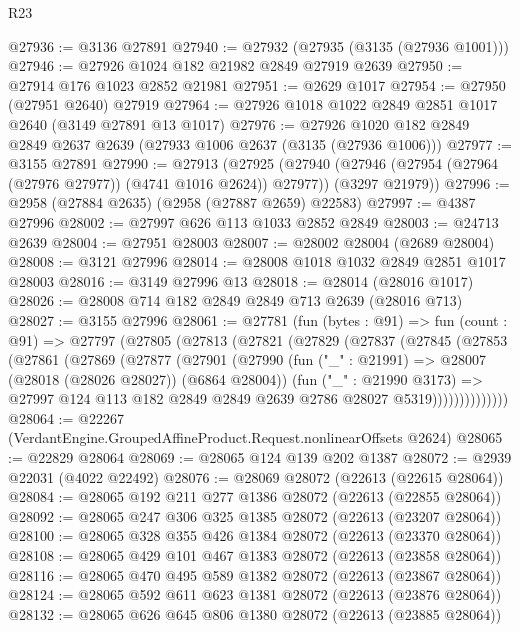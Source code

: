 \begin{lexlean}{R23}
\begin{coremodule}
@27936 := @3136 @27891
@27940 := @27932 (@27935 (@3135 (@27936 @1001)))
@27946 := @27926 @1024 @182 @21982 @2849 @27919 @2639
@27950 := @27914 @176 @1023 @2852 @21981
@27951 := @2629 @1017
@27954 := @27950 (@27951 @2640) @27919
@27964 := @27926 @1018 @1022 @2849 @2851 @1017 @2640 (@3149 @27891 @13 @1017)
@27976 := @27926 @1020 @182 @2849 @2849 @2637 @2639 (@27933 @1006 @2637 (@3135 (@27936 @1006)))
@27977 := @3155 @27891
@27990 := @27913
    (@27925
      (@27940 (@27946 (@27954 (@27964 (@27976 @27977)) (@4741 @1016 @2624)) @27977))
      (@3297 @21979))
@27996 := @2958 (@27884 @2635) (@2958 (@27887 @2659) @22583)
@27997 := @4387 @27996
@28002 := @27997 @626 @113 @1033 @2852 @2849
@28003 := @24713 @2639
@28004 := @27951 @28003
@28007 := @28002 @28004 (@2689 @28004)
@28008 := @3121 @27996
@28014 := @28008 @1018 @1032 @2849 @2851 @1017 @28003
@28016 := @3149 @27996 @13
@28018 := @28014 (@28016 @1017)
@28026 := @28008 @714 @182 @2849 @2849 @713 @2639 (@28016 @713)
@28027 := @3155 @27996
@28061 := @27781
    (fun (bytes : @91) =>
    fun (count : @91) =>
    @27797
      (@27805
        (@27813
          (@27821
            (@27829
              (@27837
                (@27845
                  (@27853
                    (@27861
                      (@27869
                        (@27877
                          (@27901
                            (@27990
                              (fun ("_" : @21991) => @28007 (@28018 (@28026 @28027)) (@6864 @28004))
                              (fun ("_" : @21990 @3173) =>
                              @27997
                                @124
                                @113
                                @182
                                @2849
                                @2849
                                @2639
                                @2786
                                @28027
                                @5319))))))))))))))
@28064 := @22267 (VerdantEngine.GroupedAffineProduct.Request.nonlinearOffsets @2624)
@28065 := @22829 @28064
@28069 := @28065 @124 @139 @202 @1387
@28072 := @2939 @22031 (@4022 @22492)
@28076 := @28069 @28072 (@22613 (@22615 @28064))
@28084 := @28065 @192 @211 @277 @1386 @28072 (@22613 (@22855 @28064))
@28092 := @28065 @247 @306 @325 @1385 @28072 (@22613 (@23207 @28064))
@28100 := @28065 @328 @355 @426 @1384 @28072 (@22613 (@23370 @28064))
@28108 := @28065 @429 @101 @467 @1383 @28072 (@22613 (@23858 @28064))
@28116 := @28065 @470 @495 @589 @1382 @28072 (@22613 (@23867 @28064))
@28124 := @28065 @592 @611 @623 @1381 @28072 (@22613 (@23876 @28064))
@28132 := @28065 @626 @645 @806 @1380 @28072 (@22613 (@23885 @28064))

\end{coremodule}
\end{lexlean}
